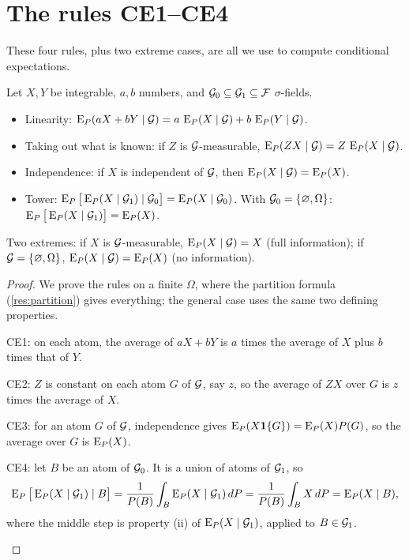 \section{The rules CE1--CE4}

These four rules, plus two extreme cases, are all we use to compute conditional expectations.

\begin{theorem}
\label{thm:ce-rules}
Let $X,Y$ be integrable, $a,b$ numbers, and $\mathcal G_0\subseteq\mathcal G_1\subseteq\mathcal F$ $\sigma$-fields.
\begin{itemize}
  \item[\textbf{CE1}] Linearity: $\operatorname{E}_P(aX+bY\mid\mathcal G)=a\,\operatorname{E}_P(X\mid\mathcal G)+b\,\operatorname{E}_P(Y\mid\mathcal G)$.
  \item[\textbf{CE2}] Taking out what is known: if $Z$ is $\mathcal G$-measurable, $\operatorname{E}_P(ZX\mid\mathcal G)=Z\,\operatorname{E}_P(X\mid\mathcal G)$.
  \item[\textbf{CE3}] Independence: if $X$ is independent of $\mathcal G$, then $\operatorname{E}_P(X\mid\mathcal G)=\operatorname{E}_P(X)$.
  \item[\textbf{CE4}] Tower: $\operatorname{E}_P\big[\operatorname{E}_P(X\mid\mathcal G_1)\mid\mathcal G_0\big]=\operatorname{E}_P(X\mid\mathcal G_0)$. With $\mathcal G_0=\{\varnothing,\Omega\}$: $\operatorname{E}_P\big[\operatorname{E}_P(X\mid\mathcal G_1)\big]=\operatorname{E}_P(X)$.
\end{itemize}
Two extremes: if $X$ is $\mathcal G$-measurable, $\operatorname{E}_P(X\mid\mathcal G)=X$ (full information); if $\mathcal G=\{\varnothing,\Omega\}$, $\operatorname{E}_P(X\mid\mathcal G)=\operatorname{E}_P(X)$ (no information).
\end{theorem}
\begin{proof}
We prove the rules on a finite $\Omega$, where the partition formula (\cref{res:partition}) gives everything; the general case uses the same two defining properties.
\begin{steps}
  \item CE1: on each atom, the average of $aX+bY$ is $a$ times the average of $X$ plus $b$ times that of $Y$.
  \item CE2: $Z$ is constant on each atom $G$ of $\mathcal G$, say $z$, so the average of $ZX$ over $G$ is $z$ times the average of $X$.
  \item CE3: for an atom $G$ of $\mathcal G$, independence gives $\operatorname{E}_P(X\mathbf{1}\{G\})=\operatorname{E}_P(X)P(G)$, so the average over $G$ is $\operatorname{E}_P(X)$.
  \item CE4: let $B$ be an atom of $\mathcal G_0$. It is a union of atoms of $\mathcal G_1$, so
  \[
    \operatorname{E}_P\big[\operatorname{E}_P(X\mid\mathcal G_1)\mid B\big]=\frac{1}{P(B)}\int_B\operatorname{E}_P(X\mid\mathcal G_1)\,dP=\frac{1}{P(B)}\int_BX\,dP=\operatorname{E}_P(X\mid B),
  \]
  where the middle step is property (ii) of $\operatorname{E}_P(X\mid\mathcal G_1)$, applied to $B\in\mathcal G_1$. \qedhere
\end{steps}
\end{proof}

